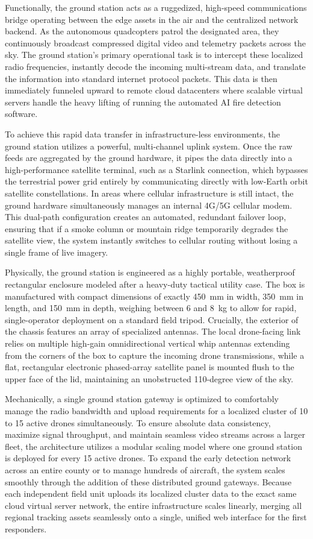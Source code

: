 \documentclass[journal, onecolumn]{IEEEtran}
\begin{document}
Functionally, the ground station acts as a ruggedized, high-speed communications bridge operating between the edge assets in the air and the centralized network backend. As the autonomous quadcopters patrol the designated area, they continuously broadcast compressed digital video and telemetry packets across the sky. The ground station's primary operational task is to intercept these localized radio frequencies, instantly decode the incoming multi-stream data, and translate the information into standard internet protocol packets. This data is then immediately funneled upward to remote cloud datacenters where scalable virtual servers handle the heavy lifting of running the automated AI fire detection software.

To achieve this rapid data transfer in infrastructure-less environments, the ground station utilizes a powerful, multi-channel uplink system. Once the raw feeds are aggregated by the ground hardware, it pipes the data directly into a high-performance satellite terminal, such as a Starlink connection, which bypasses the terrestrial power grid entirely by communicating directly with low-Earth orbit satellite constellations. In areas where cellular infrastructure is still intact, the ground hardware simultaneously manages an internal 4G/5G cellular modem. This dual-path configuration creates an automated, redundant failover loop, ensuring that if a smoke column or mountain ridge temporarily degrades the satellite view, the system instantly switches to cellular routing without losing a single frame of live imagery.

Physically, the ground station is engineered as a highly portable, weatherproof rectangular enclosure modeled after a heavy-duty tactical utility case. The box is manufactured with compact dimensions of exactly 450~mm in width, 350~mm in length, and 150~mm in depth, weighing between 6 and 8~kg to allow for rapid, single-operator deployment on a standard field tripod. Crucially, the exterior of the chassis features an array of specialized antennas. The local drone-facing link relies on multiple high-gain omnidirectional vertical whip antennas extending from the corners of the box to capture the incoming drone transmissions, while a flat, rectangular electronic phased-array satellite panel is mounted flush to the upper face of the lid, maintaining an unobstructed 110-degree view of the sky.

Mechanically, a single ground station gateway is optimized to comfortably manage the radio bandwidth and upload requirements for a localized cluster of 10 to 15 active drones simultaneously. To ensure absolute data consistency, maximize signal throughput, and maintain seamless video streams across a larger fleet, the architecture utilizes a modular scaling model where one ground station is deployed for every 15 active drones. To expand the early detection network across an entire county or to manage hundreds of aircraft, the system scales smoothly through the addition of these distributed ground gateways. Because each independent field unit uploads its localized cluster data to the exact same cloud virtual server network, the entire infrastructure scales linearly, merging all regional tracking assets seamlessly onto a single, unified web interface for the first responders.
\end{document}
